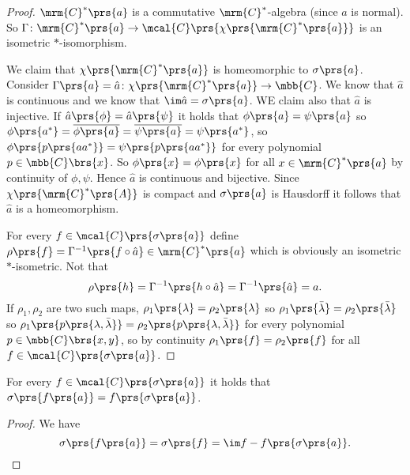 \documentclass[10pt, twoside]{book}
\begin{document}
\begin{proof}
$\mrm{C}^*\prs{a}$ is a commutative $\mrm{C}^*$-algebra (since $a$ is normal).
So $\Gamma \colon \mrm{C}^*\prs{a} \to \mcal{C}\prs{\chi\prs{\mrm{C}^*\prs{a}}}$ is an isometric $*$-isomorphism.

We claim that $\chi\prs{\mrm{C}^*\prs{a}}$ is homeomorphic to $\sigma\prs{a}$. Consider $\Gamma\prs{a} = \hat{a} \colon \chi\prs{\mrm{C}^*\prs{a}} \to \mbb{C}$. We know that $\hat{a}$ is continuous and we know that $\im \hat{a} = \sigma\prs{a}$. WE claim also that $\hat{a}$ is injective. If $\hat{a} \prs{\phi} = \hat{a} \prs{\psi}$ it holds that $\phi\prs{a} = \psi\prs{a}$ so $\phi\prs{a^*} = \overline{\phi\prs{a}} = \overline{\psi\prs{a}} = \psi\prs{a^*}$, so $\phi\prs{p\prs{a a^*}} = \psi\prs{p\prs{a a^*}}$ for every polynomial $p \in \mbb{C}\brs{x}$. So $\phi\prs{x} = \phi\prs{x}$ for all $x \in \mrm{C}^*\prs{a}$ by continuity of $\phi,\psi$.
Hence $\hat{a}$ is continuous and bijective. Since $\chi\prs{\mrm{C}^*\prs{A}}$ is compact and $\sigma\prs{a}$ is Hausdorff it follows that $\hat{a}$ is a homeomorphism.

For every $f \in \mcal{C}\prs{\sigma\prs{a}}$ define $\rho\prs{f} = \Gamma^{-1}\prs{f \circ \hat{a}} \in \mrm{C}^*\prs{a}$ which is obviously an isometric $*$-isometric.
Not that \[\rho\prs{h} = \Gamma^{-1}\prs{h \circ \hat{a}} = \Gamma^{-1}\prs{\hat{a}} = a\text{.}\]
If $\rho_1, \rho_2$ are two such maps, $\rho_1\prs{\lambda} = \rho_2\prs{\lambda}$ so $\rho_1\prs{\bar{\lambda}} = \rho_2\prs{\bar{\lambda}}$ so $\rho_1\prs{p\prs{\lambda, \bar{\lambda}}} = \rho_2\prs{p\prs{\lambda, \bar{\lambda}}}$ for every polynomial $p \in \mbb{C}\brs{x,y}$, so by continuity $\rho_1\prs{f} = \rho_2\prs{f}$ for all $f \in \mcal{C}\prs{\sigma\prs{a}}$.
\end{proof}

\begin{corollary}
For every $f \in \mcal{C}\prs{\sigma\prs{a}}$ it holds that $\sigma\prs{f\prs{a}} = f\prs{\sigma\prs{a}}$.
\end{corollary}

\begin{proof}
We have \[\sigma\prs{f\prs{a}} = \sigma\prs{f} = \im f - f\prs{\sigma\prs{a}} \text{.}\]
\end{proof}
\end{document}
